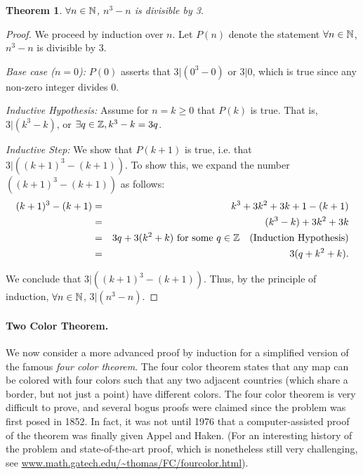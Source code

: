 \documentclass[11pt]{article}
\newcounter{thm}
\newtheorem{theorem}{Theorem}[thm]
\begin{document}

\begin{theorem} $\forall n \in \mathbb{N}$, $n^3 - n$ is divisible by 3.
\end{theorem}
\begin{proof}
We proceed by induction over $n$. Let $P(n)$ denote the statement $\forall n \in \mathbb{N}$,
$n^3 - n$ is divisible by 3.

\emph{Base case ($n=0$):} $P(0)$ asserts that $3|(0^3 - 0)$ or $3|0$, which is true since any non-zero integer divides $0$.

\emph{Inductive Hypothesis:} Assume for $n=k\geq 0$ that $P(k)$ is true. That is, $3|(k^3-k)$, or $\exists q \in \mathbb{Z}, k^3 - k = 3q$.

\emph{Inductive Step:} We show that $P(k+1)$ is true, i.e. that $3|((k+1)^3-(k+1))$. To show this, we expand the number $((k+1)^3-(k+1))$ as follows:
\begin{eqnarray*}
(k+1)^3 - (k+1) &=& k^3 + 3k^2 + 3k + 1 - (k+1) \\
&=& (k^3 - k) + 3k^2 + 3k \\
&=& 3q + 3(k^2 + k) \text{ for some }q \in \mathbb{Z} \quad\text{(Induction Hypothesis)}\\
&=& 3(q + k^2 + k).
\end{eqnarray*}


\noindent We conclude that $3|((k+1)^3-(k+1))$. Thus, by the principle of induction, $\forall n \in \mathbb{N}$, $3|(n^3-n)$.
\end{proof}

\paragraph{Two Color Theorem.} We now consider a more advanced proof by induction for a simplified version of the famous \emph{four color theorem}. The four color theorem states that
any map can be colored with four colors such that any two adjacent countries (which share a border,
but {not} just a point) have different colors.  The four color theorem is very difficult to
prove, and several bogus proofs were claimed since the problem was first posed in 1852.
In fact, it was not until 1976 that a computer-assisted proof of the theorem was finally given Appel and Haken.  (For an interesting history of the problem and state-of-the-art proof, which is nonetheless still very challenging, see \url{www.math.gatech.edu/~thomas/FC/fourcolor.html}).
\end{document}

